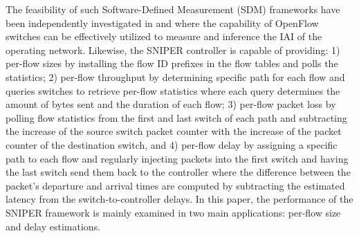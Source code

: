 The feasibility of such Software-Defined Measurement (SDM) frameworks have been independently investigated in \cite{IF14iSTAMP:2014} and \cite{Adrichen:2014} where the capability of OpenFlow switches can be effectively utilized to measure and inference the IAI of the operating network. Likewise, the SNIPER controller is capable of providing: 1) per-flow sizes \cite{IF14iSTAMP:2014} by installing the flow ID prefixes in the flow tables and polls the statistics; 2) per-flow throughput \cite{Adrichen:2014} by determining specific path for each flow and queries switches to retrieve per-flow statistics where each query determines the amount of bytes sent and the duration of each flow; 3) per-flow packet loss \cite{Adrichen:2014} by polling flow statistics from the first and last switch of each path and subtracting the increase of the source switch packet counter with the increase of the packet counter of the destination switch, and 4) per-flow delay \cite{Adrichen:2014} by assigning a specific path to each flow and regularly injecting packets into the first switch and having the last switch send them back to the controller where the difference between the packet's departure and arrival times are computed by subtracting the estimated latency from the switch-to-controller delays. In this paper, the performance of the SNIPER framework is mainly examined in two main applications: per-flow size and delay estimations.

